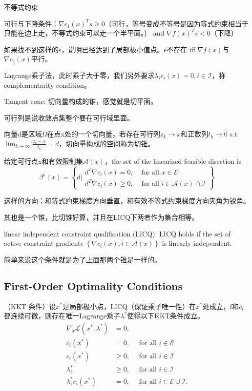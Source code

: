 不等式约束

可行与下降条件：$\nabla c_{1}(x)^{T} s \ge 0$（可行，等号变成不等号是因为等式约束相当于只能在边上走，不等式约束可以走一个半平面。） and $\nabla f(x)^{T} s<0$（下降）

如果找不到这样的s，说明已经达到了局部极小值点。s不存在  iff $\nabla f(x)$与$\nabla c_{1}(x)$平行。

Lagrange乘子法，此时乘子大于零，我们另外要求$\lambda_i c_i(x) = 0, i \in \mathcal{I}$，称complementarity condition。

Tangent cone: 切向量构成的锥，感觉就是切平面。

可行列是说收敛点集整个要在可行域里面。

向量d是区域$\Omega$在点x处的一个切向量，若存在可行列$z_k \to x$和正数列$t_k \to 0$ s.t. $\lim _{k \rightarrow \infty} \frac{z_{k}-x}{t_{k}}=d$，切向量构成的空间称为切锥。

给定可行点x和有效限制集$\mathcal{A}(x)$，the set of the linearized feasible direction is
\[
  \mathcal{F}(x) = \left\{ d \bigg| \begin{array}{ll}
    d^{T} \nabla c_{i}(x)=0, & \text { for all } x \in \mathcal{E} \\
    d^{T} \nabla c_{i}(x) \geq 0, & \text { for all } i \in \mathcal{A}(x) \cap \mathcal{I}
  \end{array} \right\}
\]

这样的方向：和等式约束梯度方向垂直，和有效不等式约束梯度方向夹角为锐角。

其也是一个锥，比切锥好算，并且在LICQ下两者作为集合相等。

linear independent constraint qualification (LICQ): LICQ holds if the set of active constraint gradients $\left\{\nabla c_{i}(x), i \in \mathcal{A}(x)\right\}$ is linearly independent.

简单来说这个条件就是为了上面那两个锥是一样的。

\subsection{First-Order Optimality Conditions}

\begin{thm}
  （KKT 条件）设$x^{\ast}$是局部极小点，LICQ（保证乘子唯一性）在$x^{\ast}$处成立，f和$c_i$都连续可微，则存在唯一Lagrange乘子$\lambda^{\ast}$使得以下KKT条件成立。
  \[
    \begin{aligned}
      \nabla_{x} \mathcal{L}\left(x^{*}, \lambda^{*}\right) & =0, \\
      c_{i}\left(x^{*}\right) & =0, \quad \text { for all } i \in \mathcal{E} \\
      c_{i}\left(x^{*}\right) & \geq 0, \quad \text { for all } i \in \mathcal{I} \\
      \lambda_{i}^{*} & \geq 0, \quad \text { for all } i \in \mathcal{I} \\
      \lambda_{i}^{*} c_{i}\left(x^{*}\right) & =0, \quad \text { for all } i \in \mathcal{E} \cup \mathcal{I}.
    \end{aligned}
  \]
\end{thm}

